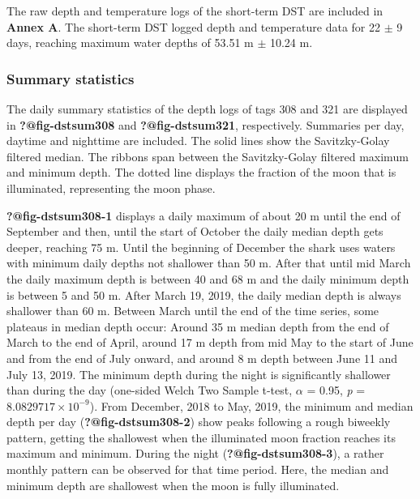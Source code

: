 \documentclass[
  authoryear,
  review,
  3p]{elsarticle}
\begin{document}
The raw depth and temperature logs of the short-term DST are included in
\textbf{Annex A}. The short-term DST logged depth and temperature data
for 22 \(\pm\) 9 days, reaching maximum water depths of 53.51 m \(\pm\)
10.24 m.

\hypertarget{sec-results-dst-summary}{%
\subsubsection{Summary statistics}\label{sec-results-dst-summary}}

The daily summary statistics of the depth logs of tags 308 and 321 are
displayed in \textbf{?@fig-dstsum308} and \textbf{?@fig-dstsum321},
respectively. Summaries per day, daytime and nighttime are included. The
solid lines show the Savitzky-Golay filtered median. The ribbons span
between the Savitzky-Golay filtered maximum and minimum depth. The
dotted line displays the fraction of the moon that is illuminated,
representing the moon phase.

\textbf{?@fig-dstsum308-1} displays a daily maximum of about 20 m until
the end of September and then, until the start of October the daily
median depth gets deeper, reaching 75 m. Until the beginning of December
the shark uses waters with minimum daily depths not shallower than 50 m.
After that until mid March the daily maximum depth is between 40 and 68
m and the daily minimum depth is between 5 and 50 m. After March 19,
2019, the daily median depth is always shallower than 60 m. Between
March until the end of the time series, some plateaus in median depth
occur: Around 35 m median depth from the end of March to the end of
April, around 17 m depth from mid May to the start of June and from the
end of July onward, and around 8 m depth between June 11 and July 13,
2019. The minimum depth during the night is significantly shallower than
during the day (one-sided Welch Two Sample t-test, \(\alpha\) = 0.95,
\emph{p} = \ensuremath{8.0829717\times 10^{-9}}). From December, 2018 to
May, 2019, the minimum and median depth per day
(\textbf{?@fig-dstsum308-2}) show peaks following a rough biweekly
pattern, getting the shallowest when the illuminated moon fraction
reaches its maximum and minimum. During the night
(\textbf{?@fig-dstsum308-3}), a rather monthly pattern can be observed
for that time period. Here, the median and minimum depth are shallowest
when the moon is fully illuminated.
\end{document}
